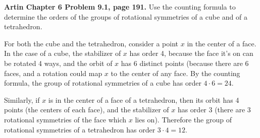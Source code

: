\documentclass{article}
\begin{document}
\bigskip
\begin{prob}
    \textbf{Artin Chapter 6 Problem 9.1, page 191.} Use the counting formula to determine the orders of the groups of rotational symmetries of a cube and of a tetrahedron.
\end{prob}
For both the cube and the tetrahedron, consider a point $x$ in the center of a face. In the case of a cube, the stabilizer of $x$ has order 4, because the face it's on can be rotated 4 ways, and the orbit of $x$ has 6 distinct points (because there are 6 faces, and a rotation could map $x$ to the center of any face. By the counting formula, the group of rotational symmetries of a cube has order $4 \cdot 6 = 24$.
\par
Similarly, if $x$ is in the center of a face of a tetrahedron, then its orbit has 4 points (the centers of each face), and the stabilizer of $x$ has order 3 (there are 3 rotational symmetries of the face which $x$ lies on). Therefore the group of rotational symmetries of a tetrahedron has order $3 \cdot 4 = 12$.
\end{document}
